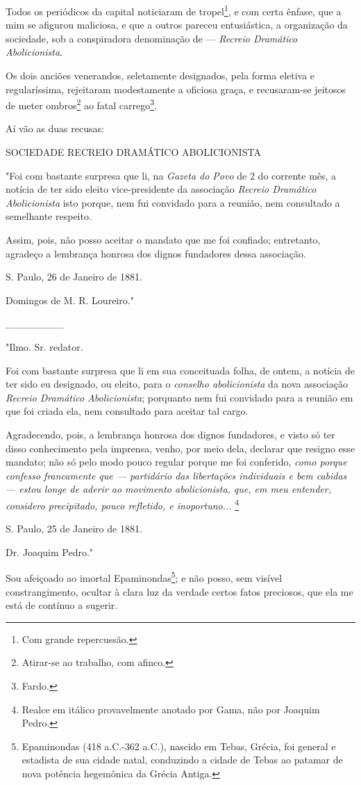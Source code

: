 Todos os periódicos da capital noticiaram de tropel\footnote{Com
  grande repercussão.}, e com certa ênfase, que a mim se afigurou
maliciosa, e que a outros pareceu entusiástica, a organização da
sociedade, sob a conspiradora denominação de --- \emph{Recreio
Dramático Abolicionista}.

Os dois anciões venerandos, seletamente designados, pela forma eletiva e
regularíssima, rejeitaram modestamente a oficiosa graça, e recusaram-se
jeitosos de meter ombros\footnote{Atirar-se ao trabalho, com afinco.}
ao fatal carrego\footnote{Fardo.}.

Aí vão as duas recusas:

SOCIEDADE RECREIO DRAMÁTICO ABOLICIONISTA

"Foi com bastante surpresa que li, na \emph{Gazeta do Povo} de 2 do
corrente mês, a notícia de ter sido eleito vice-presidente da associação
\emph{Recreio Dramático Abolicionista} isto porque, nem fui convidado
para a reunião, nem consultado a semelhante respeito.

Assim, pois, não posso aceitar o mandato que me foi confiado;
entretanto, agradeço a lembrança honrosa dos dignos fundadores dessa
associação.

S. Paulo, 26 de Janeiro de 1881.

Domingos de M. R. Loureiro."

\_\_\_\_\_\_\_\_

"Ilmo. Sr. redator.

Foi com bastante surpresa que li em sua conceituada folha, de ontem, a
notícia de ter sido eu designado, ou eleito, para o \emph{conselho
abolicionista} da nova associação \emph{Recreio Dramático
Abolicionista}; porquanto nem fui convidado para a reunião em que foi
criada ela, nem consultado para aceitar tal cargo.

Agradecendo, pois, a lembrança honrosa dos dignos fundadores, e visto só
ter disso conhecimento pela imprensa, venho, por meio dela, declarar que
resigno esse mandato; não só pelo modo pouco regular porque me foi
conferido, \emph{como porque confesso francamente que --- partidário
das libertações individuais e bem cabidas --- estou longe de aderir ao
movimento abolicionista, que, em meu entender, considero precipitado,
pouco refletido, e inoportuno...} \footnote{Realce em itálico
  provavelmente anotado por Gama, não por Joaquim Pedro.}

S. Paulo, 25 de Janeiro de 1881.

Dr. Joaquim Pedro."

Sou afeiçoado ao imortal Epaminondas\footnote{Epaminondas (418
  a.C.-362 a.C.), nascido em Tebas, Grécia, foi general e estadista de
  sua cidade natal, conduzindo a cidade de Tebas ao patamar de nova
  potência hegemônica da Grécia Antiga.}; e não posso, sem visível
constrangimento, ocultar à clara luz da verdade certos fatos preciosos,
que ela me está de contínuo a sugerir.

